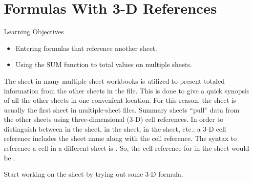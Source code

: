 \section{Formulas With 3-D References}

\begin{center}
	\begin{objbox}{Learning Objectives}
		\begin{itemize}
			\setlength{\itemsep}{0pt}
			\setlength{\parskip}{0pt}
			\setlength{\parsep}{0pt}

			\item Entering formulas that reference another sheet.
			\item Using the SUM function to total values on multiple sheets.
			
		\end{itemize}
	\end{objbox}
\end{center}

The  sheet in many multiple sheet workbooks is utilized to present totaled information from the other sheets in the file. This is done to give a quick synopsis of all the other sheets in one convenient location. For this reason, the  sheet is usually the first sheet in multiple-sheet files. Summary sheets ``pull'' data from the other sheets using three-dimensional (3-D) cell references. In order to distinguish between  in the  sheet,  in the  sheet,  in the  sheet, etc.; a 3-D cell reference includes the sheet name along with the cell reference. The syntax to reference a cell in a different sheet is . So, the cell reference for  in the  sheet would be .

Start working on the  sheet by trying out some 3-D formula.

